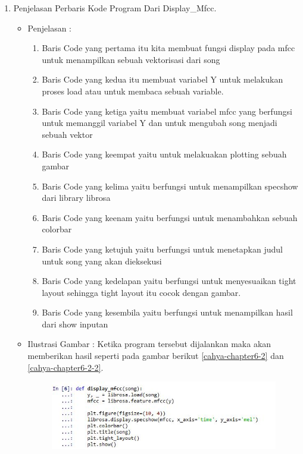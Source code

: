 \begin{enumerate}
\begin{itemize}
\end{itemize}
\par
\item Penjelasan Perbaris Kode Program Dari Display\_Mfcc.
\begin{itemize}
\item Penjelasan :
\par
\begin{enumerate}
\item Baris Code yang pertama itu kita membuat fungsi display pada mfcc untuk menampilkan sebuah vektorisasi dari song
\item Baris Code yang kedua itu membuat variabel Y untuk melakukan proses load atau untuk membaca sebuah variable. 
\item Baris Code yang ketiga yaitu membuat variabel mfcc yang berfungsi untuk memanggil variabel Y dan untuk mengubah song menjadi sebuah vektor
\item Baris Code yang keempat yaitu untuk melakuakan plotting sebuah gambar
\item Baris Code yang kelima yaitu berfungsi untuk menampilkan specshow dari library librosa
\item Baris Code yang keenam yaitu berfungsi untuk menambahkan sebuah colorbar
\item Baris Code yang ketujuh yaitu berfungsi untuk menetapkan judul untuk song yang akan dieksekusi
\item Baris Code yang kedelapan yaitu berfungsi untuk menyesuaikan tight layout sehingga tight layout itu cocok dengan gambar.
\item Baris Code yang kesembila yaitu berfungsi untuk menampilkan hasil dari show inputan
\end{enumerate}
\par
\item Ilustrasi Gambar : Ketika program tersebut dijalankan maka akan memberikan hasil seperti pada gambar berikut \ref {cahya-chapter6-2} dan \ref{cahya-chapter6-2-2}.
\par
\begin{figure}[!hbtp]
\centering
\includegraphics[scale=0.2]{figures/cahya-chapter6-2.jpg}

\end{figure}
\end{itemize}
\end{enumerate}
